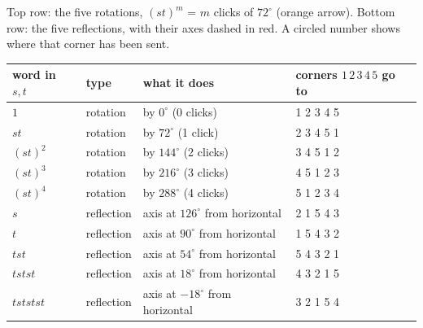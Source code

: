\documentclass[10pt]{article}
\begin{document}
{\begin{minipage}[t]{744pt}
\par\vspace{2pt}
{\scriptsize Top row: the five rotations, $(st)^m$ = $m$ clicks of $72^\circ$ (orange arrow). Bottom row: the five reflections, with their axes dashed in red. A circled number shows where that corner has been sent.}\par\vspace{8pt}
\begin{minipage}[t]{380pt}\vspace{0pt}
\centering\small
\begin{tabular}{@{}llll@{}}
\toprule
word in $s,t$ & type & what it does & corners $1\,2\,3\,4\,5$ go to\\
\midrule
$1$ & rotation & by $0^\circ$ (0 clicks) & 1 2 3 4 5\\
$st$ & rotation & by $72^\circ$ (1 click) & 2 3 4 5 1\\
$(st)^2$ & rotation & by $144^\circ$ (2 clicks) & 3 4 5 1 2\\
$(st)^3$ & rotation & by $216^\circ$ (3 clicks) & 4 5 1 2 3\\
$(st)^4$ & rotation & by $288^\circ$ (4 clicks) & 5 1 2 3 4\\
\midrule
$s$ & reflection & axis at $126^\circ$ from horizontal & 2 1 5 4 3\\
$t$ & reflection & axis at $90^\circ$ from horizontal & 1 5 4 3 2\\
$tst$ & reflection & axis at $54^\circ$ from horizontal & 5 4 3 2 1\\
$tstst$ & reflection & axis at $18^\circ$ from horizontal & 4 3 2 1 5\\
$tststst$ & reflection & axis at $-18^\circ$ from horizontal & 3 2 1 5 4\\
\bottomrule
\end{tabular}
\end{minipage}\hfill
\begin{minipage}[t]{350pt}\vspace{0pt}
\raggedright
\begin{why}

\end{why}
\end{minipage}
\end{minipage}}
\end{document}
